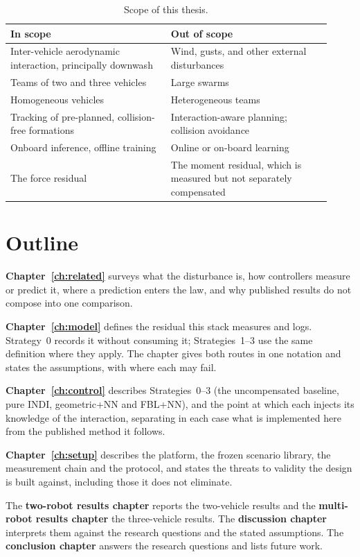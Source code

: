 \begin{table}[h]
  \centering
  \caption{Scope of this thesis.}
  \label{tab:intro-scope}
  \small
  \begin{tabular}{@{}p{0.46\linewidth}p{0.46\linewidth}@{}}
    \toprule
    In scope & Out of scope \\
    \midrule
    Inter-vehicle aerodynamic interaction, principally downwash & Wind, gusts, and other external disturbances \\
    Teams of two and three vehicles & Large swarms \\
    Homogeneous vehicles & Heterogeneous teams \\
    Tracking of pre-planned, collision-free formations & Interaction-aware planning; collision avoidance \\
    Onboard inference, offline training & Online or on-board learning \\
    The force residual & The moment residual, which is measured but not separately compensated \\
    \bottomrule
  \end{tabular}
\end{table}

\section{Outline}
\label{sec:intro-outline}

\textbf{Chapter~\ref{ch:related}} surveys what the disturbance is, how controllers measure or
predict it, where a prediction enters the law, and why published results do not compose into one
comparison.

\textbf{Chapter~\ref{ch:model}} defines the residual this stack measures and logs. Strategy~0
records it without consuming it; Strategies~1--3 use the same definition where they apply. The
chapter gives both routes in one notation and states the assumptions, with where each may fail.

\textbf{Chapter~\ref{ch:control}} describes Strategies~0--3 (the uncompensated baseline, pure INDI,
geometric+NN and FBL+NN), and the point at which each
injects its knowledge of the interaction, separating in each case what is implemented here from the
published method it follows.

\textbf{Chapter~\ref{ch:setup}} describes the platform, the frozen scenario library, the
measurement chain and the protocol, and states the threats to validity the design is built against, including those it does not eliminate.

The \textbf{two-robot results chapter} reports the two-vehicle results and the \textbf{multi-robot
results chapter} the three-vehicle results. The \textbf{discussion chapter} interprets them against
the research questions and the stated assumptions. The \textbf{conclusion chapter} answers the
research questions and lists future work.
